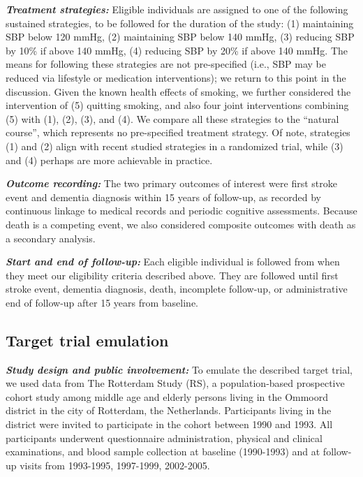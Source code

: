 \documentclass[
]{book}
\begin{document}
\textbf{\emph{Treatment strategies:}} Eligible individuals are assigned to one of the following sustained strategies, to be followed for the duration of the study: (1) maintaining SBP below 120 mmHg, (2) maintaining SBP below 140 mmHg, (3) reducing SBP by 10\% if above 140 mmHg, (4) reducing SBP by 20\% if above 140 mmHg. The means for following these strategies are not pre-specified (i.e., SBP may be reduced via lifestyle or medication interventions); we return to this point in the discussion. Given the known health effects of smoking, we further considered the intervention of (5) quitting smoking, and also four joint interventions combining (5) with (1), (2), (3), and (4). We compare all these strategies to the ``natural course'', which represents no pre-specified treatment strategy. Of note, strategies (1) and (2) align with recent studied strategies in a randomized trial\autocite{williamson2019}, while (3) and (4) perhaps are more achievable in practice.

\textbf{\emph{Outcome recording:}} The two primary outcomes of interest were first stroke event and dementia diagnosis within 15 years of follow-up, as recorded by continuous linkage to medical records and periodic cognitive assessments. Because death is a competing event, we also considered composite outcomes with death as a secondary analysis.

\textbf{\emph{Start and end of follow-up:}} Each eligible individual is followed from when they meet our eligibility criteria described above. They are followed until first stroke event, dementia diagnosis, death, incomplete follow-up, or administrative end of follow-up after 15 years from baseline.

\hypertarget{target-trial-emulation}{%
\subsection{Target trial emulation}\label{target-trial-emulation}}

\textbf{\emph{Study design and public involvement:}} To emulate the described target trial, we used data from The Rotterdam Study (RS), a population-based prospective cohort study among middle age and elderly persons living in the Ommoord district in the city of Rotterdam, the Netherlands. Participants living in the district were invited to participate in the cohort between 1990 and 1993. All participants underwent questionnaire administration, physical and clinical examinations, and blood sample collection at baseline (1990-1993) and at follow-up visits from 1993-1995, 1997-1999, 2002-2005\autocite{ikram2017}.
\end{document}
